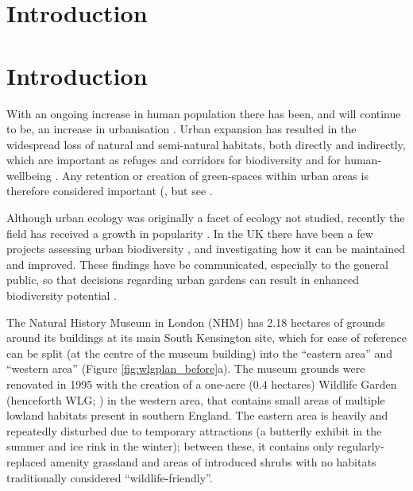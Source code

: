 \ifappendixStyle %
\section{Introduction} %
\else
\section*{Introduction}
\fi


With an ongoing increase in human population there has been, and will continue to be, an increase in urbanisation \citep{unitednations:2014wg}. Urban expansion has resulted in the widespread loss of natural and semi-natural habitats, both directly and indirectly, which are important as refuges and corridors for biodiversity \citep{Goulson:2002oe,Osborne:2008jpe} and for human-wellbeing \citep{Fuller:2007bl,Dallimer:2012bs,Bratman:2015nature,Shanahan:2016sr}. Any retention or creation of green-spaces within urban areas is therefore considered important (\citealt{Alvey:2006uf}, but see \citealt{Dearborn:2010cb}.

Although urban ecology was originally a facet of ecology not studied, recently the field has received a growth in popularity \citep{Mcphearson:2016Bs}.  In the UK there have been a few projects assessing urban biodiversity \citep{Gaston:2004bugs,Angold:2006ste}, and investigating how it can be maintained and improved. These findings have be communicated, especially to the general public, so that decisions regarding urban gardens can result in enhanced biodiversity potential \citep[e.g.][]{Thompson:2007no}.

The Natural History Museum in London (NHM) has 2.18 hectares of grounds around its buildings at its main South Kensington site, which for ease of reference can be split (at the centre of the museum building) into the ``eastern area'' and ``western area'' (Figure \ref{fig:wlgplan_before}a). The museum grounds were renovated in 1995 with the creation of a one-acre (0.4 hectares) Wildlife Garden (henceforth WLG; \citealt{Honey:1999ln}) in the western area, that contains small areas of multiple lowland habitats present in southern England. The eastern area is heavily and repeatedly disturbed due to temporary attractions (a butterfly exhibit in the summer and ice rink in the winter); between these, it contains only regularly-replaced amenity grassland and areas of introduced shrubs with no habitats traditionally considered ``wildlife-friendly''. 


